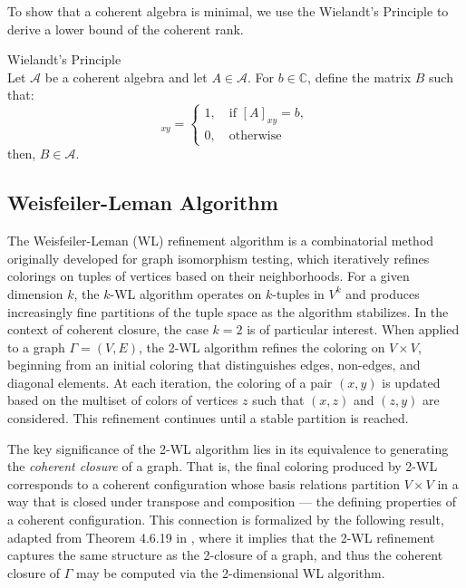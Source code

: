 To show that a coherent algebra is minimal, we use the Wielandt's Principle \cite{wielandt} to derive a lower bound of the coherent rank.
\begin{theorem} Wielandt's Principle \label{def:wielandt-priniple} \\
    Let $\mathcal{A}$ be a coherent algebra and let $A\in\mathcal{A}$. For $b\in\mathbb{C}$, define the matrix $B$ such that:
    \begin{equation*}
        [B]_{xy}=\begin{cases}
            1,\quad\text{if }[A]_{xy}=b,\\
            0,\quad\text{otherwise}
        \end{cases}
    \end{equation*}
    then, $B\in\mathcal{A}$.
\end{theorem}

\subsection{Weisfeiler-Leman Algorithm}

The Weisfeiler-Leman (WL) refinement algorithm is a combinatorial method originally developed for graph isomorphism testing, which iteratively refines colorings on tuples of vertices based on their neighborhoods. For a given dimension \(k\), the \(k\)-WL algorithm operates on \(k\)-tuples in \(V^k\) and produces increasingly fine partitions of the tuple space as the algorithm stabilizes. In the context of coherent closure, the case \(k = 2\) is of particular interest. When applied to a graph \(\Gamma=(V,E)\), the 2-WL algorithm refines the coloring on \(V \times V\), beginning from an initial coloring that distinguishes edges, non-edges, and diagonal elements. At each iteration, the coloring of a pair \((x, y)\) is updated based on the multiset of colors of vertices \(z\) such that \((x, z)\) and \((z, y)\) are considered. This refinement continues until a stable partition is reached.

The key significance of the 2-WL algorithm lies in its equivalence to generating the \emph{coherent closure} of a graph. That is, the final coloring produced by 2-WL corresponds to a coherent configuration whose basis relations partition \(V \times V\) in a way that is closed under transpose and composition — the defining properties of a coherent configuration. This connection is formalized by the following result, adapted from Theorem 4.6.19 in \cite{ponomarenko_ccnotes}, where it implies that the 2-WL refinement captures the same structure as the 2-closure of a graph, and thus the coherent closure of \(\Gamma\) may be computed via the 2-dimensional WL algorithm.

